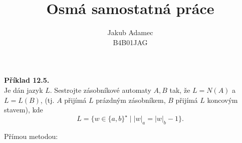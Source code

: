 \documentclass[11pt]{article}
\begin{document}

\newcommand\splitpage[2]{
      \begin{minipage}[t]{0.45\textwidth}#1
      \end{minipage}%
      \hfill
      \begin{minipage}[t]{0.45\textwidth}#2
      \end{minipage}
}
 
 
\title{\textbf{Osmá samostatná práce}}
\author{Jakub Adamec\\ %
B4B01JAG} %

\maketitle

\noindent
\textbf{Příklad 12.5.}\\
Je dán jazyk $L$. Sestrojte zásobníkové automaty $A, B$ tak, že $L = N(A)$ a $L = L(B)$, (tj. $A$ přijímá $L$ prázdným 
zásobníkem, $B$ přijímá $L$ koncovým stavem), kde
\[L = \{w \in \{a,b\}^\star \mid |w|_a = |w|_b -1\}\text{.}\]

Přímou metodou:
\end{document}
